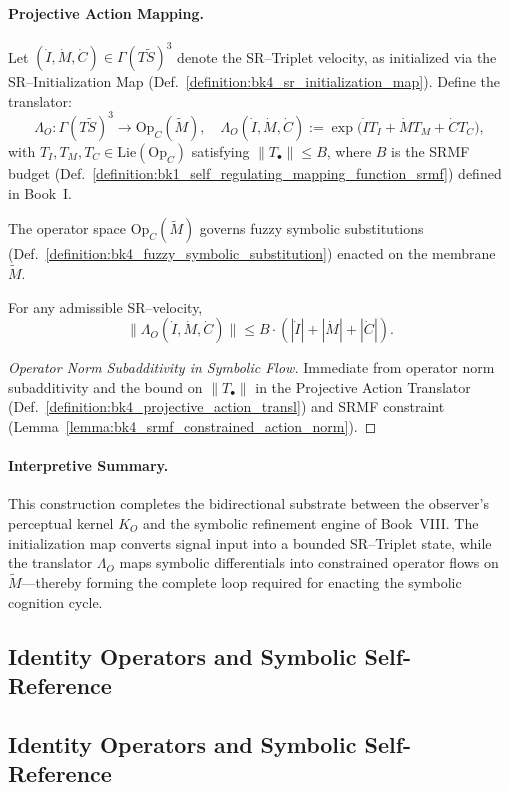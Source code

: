 \paragraph{Projective Action Mapping.}
\begin{definition}
\label{definition:bk4_projective_action_transl}
Let $(\dot{I}, \dot{M}, \dot{C}) \in \Gamma(T\widetilde{S})^3$ denote the SR--Triplet velocity,
as initialized via the SR--Initialization Map (Def.~\ref{definition:bk4_sr_initialization_map}).
Define the translator:
\[
\Lambda_O\colon \Gamma(T\widetilde{S})^3 \to \mathrm{Op}_C(\widetilde{M}), \quad
\Lambda_O(\dot{I}, \dot{M}, \dot{C}) :=
\exp\bigl(\dot{I} T_I + \dot{M} T_M + \dot{C} T_C\bigr),
\]
with $T_I, T_M, T_C \in \mathrm{Lie}(\mathrm{Op}_C)$ satisfying $\|T_\bullet\| \leq B$, where $B$ is the SRMF budget (Def.~\ref{definition:bk1_self_regulating_mapping_function_srmf}) defined in Book~I.

The operator space $\mathrm{Op}_C(\widetilde{M})$ governs fuzzy symbolic substitutions
(Def.~\ref{definition:bk4_fuzzy_symbolic_substitution}) enacted on the membrane $\widetilde{M}$.
\end{definition}
\begin{lemma}
\label{lemma:bk4_srmf_constrained_action_norm}
For any admissible SR--velocity,
\[
\|\Lambda_O(\dot{I}, \dot{M}, \dot{C})\| \leq
B \cdot (|\dot{I}| + |\dot{M}| + |\dot{C}|).
\]
\end{lemma}
\begin{proof}[Operator Norm Subadditivity in Symbolic Flow]
\label{proof:bk4_operator_norm_subadditivity}
Immediate from operator norm subadditivity and the bound on $\|T_\bullet\|$
in the Projective Action Translator (Def.~\ref{definition:bk4_projective_action_transl}) and
SRMF constraint (Lemma~\ref{lemma:bk4_srmf_constrained_action_norm}).
\end{proof}
\paragraph{Interpretive Summary.}
This construction completes the bidirectional substrate between the observer’s perceptual kernel $K_O$ and the symbolic refinement engine of Book~VIII. The initialization map converts signal input into a bounded SR--Triplet state, while the translator $\Lambda_O$ maps symbolic differentials into constrained operator flows on $\widetilde{M}$—thereby forming the complete loop required for enacting the symbolic cognition cycle.
\subsection{Identity Operators and Symbolic Self-Reference} \subsection{Identity Operators and Symbolic Self-Reference}
\label{subsec:bk4_identity_operators_symbolic_self_reference}

